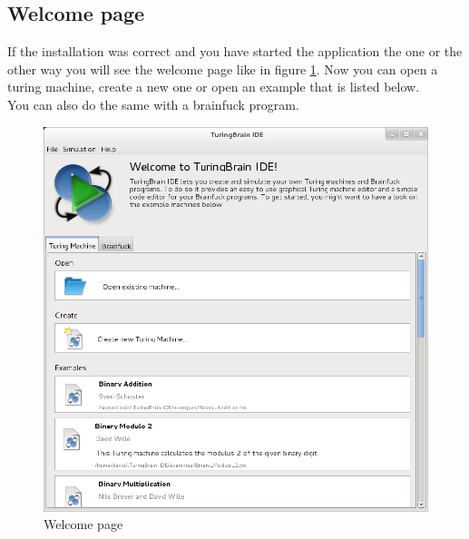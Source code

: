 \documentclass[%
  a4paper,%
  11pt,%
  blue,%
  hyperref	%
  ]{tubsartcl}
\begin{document}
\subsection{Welcome page}
\label{sec:welcome-page}
If the installation was correct and you have started the application the one or the other way you will see the welcome page like in figure \ref{pic:welcome_page}. Now you can open a turing machine, create a new one or open an example that is listed below. \\
You can also do the same with a brainfuck program.
\begin{figure}[!htb]
\begin{center}
\includegraphics[scale=0.45]{graphics_gui/welcomescreen.png}
\end{center}
\caption{Welcome page}
\label{pic:welcome_page}
\end{figure}

\newpage
\end{document}
